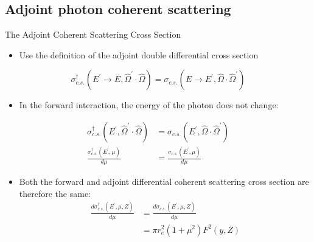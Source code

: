 \documentclass{beamer}
\begin{document}
\subsection{Adjoint photon coherent scattering}
\begin{frame}{The Adjoint Coherent Scattering Cross Section}

  \begin{itemize}
    \item Use the definition of the adjoint double differential cross section
  \end{itemize}
  
  \begin{equation*}
    \sigma_{c.s.}^{\dagger}(E^{'} \to E, \hat{\Omega}^{'} \cdot \hat{\Omega}) =
    \sigma_{c.s.}(E \to E^{'},\hat{\Omega} \cdot \hat{\Omega}^{'})
  \end{equation*}
  
  \bigskip

  \begin{itemize}
  \item In the forward interaction, the energy of the photon does not change: 
  \end{itemize}
  \begin{align}
    \sigma_{c.s.}^{\dagger}(E^{'}, \hat{\Omega}^{'} \cdot \hat{\Omega}) & = 
    \sigma_{c.s.}(E^{'},\hat{\Omega} \cdot \hat{\Omega}^{'}) \nonumber \\
    \frac{\sigma_{c.s.}^{\dagger}(E^{'}, \mu)}{d\mu} & = 
    \frac{\sigma_{c.s.}(E^{'}, \mu)}{d\mu} \nonumber
  \end{align}

  \medskip

  \begin{itemize}
    \item Both the forward and adjoint differential coherent scattering cross
      section are therefore the same:
      \begin{align}
        \frac{d\sigma_{c.s.}^{\dagger}(E^{'},\mu,Z)}{d\mu} & = 
        \frac{d\sigma_{c.s.}(E^{'},\mu,Z)}{d\mu} \nonumber \\
        & = \pi r_e^2 (1 + \mu^2)F^2(y,Z) \nonumber
      \end{align}
  \end{itemize}

\end{frame}
\end{document}
